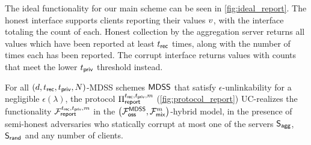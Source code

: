 


The ideal functionality for our main scheme can be seen in \cref{fig:ideal_report}.
The honest interface supports clients reporting their values $v$, with the interface totaling the count of each.
Honest collection by the aggregation server returns all values which have been reported at least $t_{\sf rec}$ times, along with the number of times each has been reported.
The corrupt interface returns values with counts that meet the lower $t_{\sf priv}$ threshold instead.

\begin{theorem}
	\label{thm:report-security}
	For all $(d, t_{\sf rec}, t_{\sf priv}, N)$-MDSS schemes ${\sf MDSS}$ that satisfy $\epsilon$-unlinkability for a negligible $\epsilon(\lambda)$, the protocol $\Pi_{\sf report}^{t_{\sf rec},t_{\sf priv}, m}$ (\cref{fig:protocol_report}) UC-realizes the functionality $\mathcal{F}_{\sf report}^{t_{\sf rec},t_{\sf priv},m}$ in the $\left(\mathcal{F}_{\sf oss}^{\sf MDSS}, \mathcal{F}_{\sf mix}^{m}\right)$-hybrid model, in the presence of semi-honest adversaries who statically corrupt at most one of the servers $\mathsf{S}_{\mathsf{agg}}$, $\mathsf{S}_{\mathsf{rand}}$ and any number of clients.
\end{theorem}

